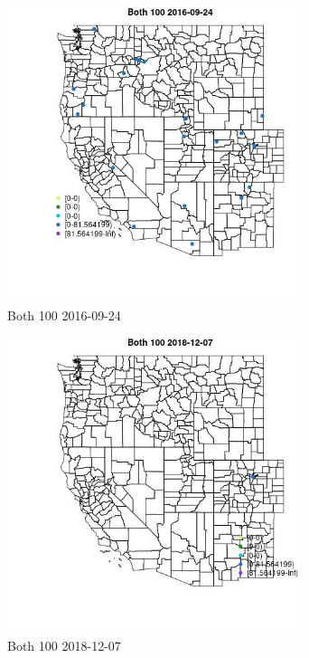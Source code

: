 \begin{figure} 
\centering  
\includegraphics[width=0.77\textwidth]{Code_Outputs/Report_ML_input_PM25_Step4_part_e_de_duplicated_aves_MapObsBoth_1002016-09-24.jpg} 
\caption{\label{fig:Report_ML_input_PM25_Step4_part_e_de_duplicated_avesMapObsBoth_1002016-09-24}Both 100 2016-09-24} 
\end{figure} 
 

\begin{figure} 
\centering  
\includegraphics[width=0.77\textwidth]{Code_Outputs/Report_ML_input_PM25_Step4_part_e_de_duplicated_aves_MapObsBoth_1002018-12-07.jpg} 
\caption{\label{fig:Report_ML_input_PM25_Step4_part_e_de_duplicated_avesMapObsBoth_1002018-12-07}Both 100 2018-12-07} 
\end{figure} 
 

